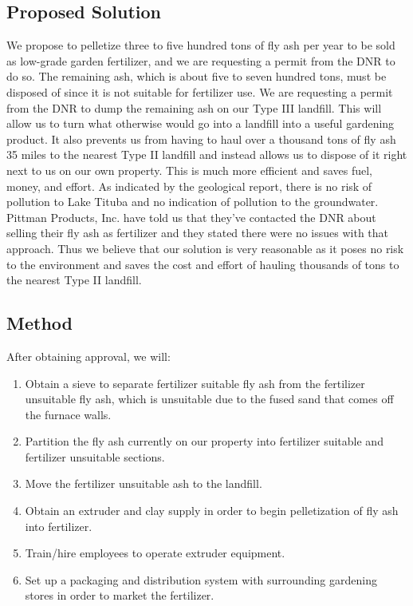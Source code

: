 \documentclass[a4paper,10pt]{article}
\begin{document}
\begin{multicols*}{2}
\subsection*{Proposed Solution}
We propose to pelletize three to five hundred tons of fly ash per year to be sold as low-grade garden fertilizer, and we
are requesting a permit from the DNR to do so. The remaining ash, which is about five to seven hundred tons, must be
disposed of since it is not suitable for fertilizer use. We are requesting a permit from the DNR to dump the remaining
ash on our Type III landfill. 
This will allow us to turn what otherwise would go into a landfill into a useful gardening product. It also prevents us
from having to haul over a thousand tons of fly ash 35 miles to the nearest Type II landfill and instead allows us to
dispose of it right next to us on our own property. This is much more efficient and saves fuel, money, and effort. As
indicated by the geological report, there is no risk of pollution to Lake Tituba and no indication of pollution to the
groundwater. Pittman Products, Inc. have told us that they’ve contacted the DNR about selling their fly ash as
fertilizer and they stated there were no issues with that approach. Thus we believe that our solution is very reasonable
as it poses no risk to the environment and saves the cost and effort of hauling thousands of tons to the nearest Type II landfill.

\subsection*{Method}
After obtaining approval, we will:
\begin{enumerate}
	\item Obtain a sieve to separate fertilizer suitable fly ash from the fertilizer unsuitable fly ash, which is
	 	  unsuitable due to the fused sand that comes off the furnace walls.
	\item Partition the fly ash currently on our property into fertilizer suitable and fertilizer unsuitable sections.
	\item Move the fertilizer unsuitable ash to the landfill.
	\item Obtain an extruder and clay supply in order to begin pelletization of fly ash into fertilizer.
	\item Train/hire employees to operate extruder equipment.
	\item Set up a packaging and distribution system with surrounding gardening stores in order to market the
	fertilizer.
\end{enumerate}


\end{multicols*}
\end{document}

